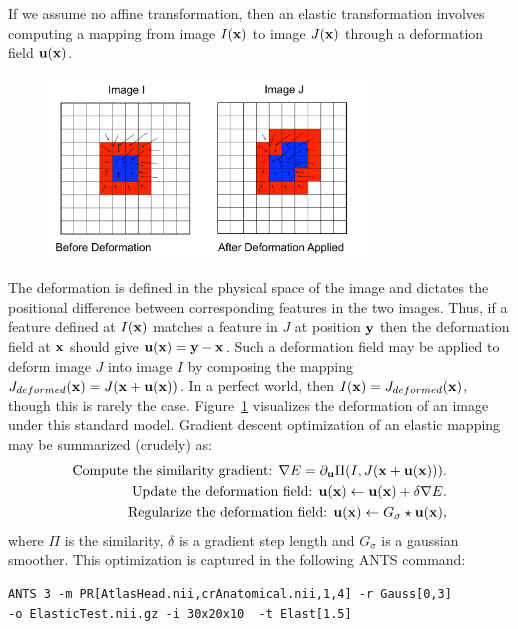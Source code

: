 \documentclass{InsightArticle}
\newcommand{\x}{{\bf x}}
\newcommand{\y}{{\bf y}}
\newcommand{\disp}{{\bf u}}
\begin{document}
 If we assume no affine transformation, then 
an elastic transformation involves computing a mapping from image $I(\x)$ to image $J(\x)$ 
through a deformation field $\disp( \x )$.  
\begin{figure}
\label{fig:pull}
\center \includegraphics[width=0.75\textwidth]{./Figures/PullBack.pdf} 
\end{figure}  
The deformation is defined in the physical space of the image 
and dictates the positional difference between corresponding features in the two images.  
Thus, if a feature defined at $I(\x)$ matches a feature in $J$ at position $\y$ then the deformation 
field at $\x$ should give $\disp ( \x )=\y-\x$.   
Such a deformation field may be applied to deform 
image $J$ into image $I$ by composing the mapping $J_{deformed}(\x)=J(\x+\disp(\x))$.  
In a perfect world, then $I(\x)=J_{deformed}(\x)$, though this is rarely the case.  Figure~\ref{fig:pull} 
visualizes the deformation of an image under this standard model. 
Gradient descent optimization of an elastic mapping may be summarized (crudely) as: 
\begin{align}
\text{Compute the similarity gradient:   }  \nabla E = \partial_{\disp} \Pi(I,J(\x+\disp(\x))). \nonumber \\
\text{Update the deformation field:  }  \disp(\x) \leftarrow \disp(\x)+\delta \nabla E. \nonumber \\ 
\text{Regularize the deformation field:  }  \disp(\x) \leftarrow G_\sigma \star \disp(\x),
\end{align}
where $\Pi$ is the similarity, $\delta$ is a gradient step length and $G_\sigma$ is a gaussian smoother.
This optimization is captured in the following ANTS command:
\begin{verbatim}
ANTS 3 -m PR[AtlasHead.nii,crAnatomical.nii,1,4] -r Gauss[0,3]  
-o ElasticTest.nii.gz -i 30x20x10  -t Elast[1.5] 
\end{verbatim}
\end{document}

